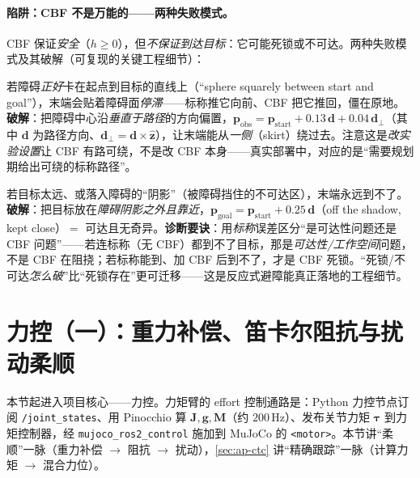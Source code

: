 \paragraph{陷阱：CBF 不是万能的——两种失败模式。}
CBF 保证\emph{安全}（$h\ge0$），但\emph{不保证到达目标}：它可能死锁或不可达。两种失败模式及其破解（可复现的关键工程细节）：

\begin{pitfall}\label{pit:ap-cbf-deadlock}
若障碍\emph{正好}卡在起点到目标的直线上（“sphere squarely between start and goal”），末端会贴着障碍面\emph{停滞}——标称推它向前、CBF 把它推回，僵在原地。\textbf{破解}：把障碍中心沿\emph{垂直于路径}的方向偏置，$\mathbf{p}_{\mathrm{obs}}=\mathbf{p}_{\mathrm{start}}+0.13\,\mathbf{d}+0.04\,\mathbf{d}_\perp$（其中 $\mathbf{d}$ 为路径方向、$\mathbf{d}_\perp=\mathbf{d}\times\hat{\mathbf{z}}$），让末端能从\emph{一侧}（skirt）绕过去。注意这是\emph{改实验设置}让 CBF 有路可绕，不是改 CBF 本身——真实部署中，对应的是“需要规划期给出可绕的标称路径”。
\end{pitfall}

\begin{pitfall}\label{pit:ap-cbf-unreach}
若目标太远、或落入障碍的“阴影”（被障碍挡住的不可达区），末端永远到不了。\textbf{破解}：把目标放在\emph{障碍阴影之外且靠近}，$\mathbf{p}_{\mathrm{goal}}=\mathbf{p}_{\mathrm{start}}+0.25\,\mathbf{d}$（off the shadow, kept close）$=$ 可达且无奇异。\textbf{诊断要诀}：用\emph{标称}误差区分“是可达性问题还是 CBF 问题”——若连标称（无 CBF）都到不了目标，那是\emph{可达性/工作空间}问题，不是 CBF 在阻挠；若标称能到、加 CBF 后到不了，才是 CBF 死锁。“死锁/不可达\emph{怎么破}”比“死锁存在”更可迁移——这是反应式避障能真正落地的工程细节。
\end{pitfall}

\section{力控（一）：重力补偿、笛卡尔阻抗与扰动柔顺}
\label{sec:ap-impedance}

本节起进入项目核心——力控。力矩臂的 effort 控制通路是：Python 力控节点订阅 \texttt{/joint\_states}、用 Pinocchio 算 $\mathbf{J},\mathbf{g},\mathbf{M}$（约 $200\,\mathrm{Hz}$）、发布关节力矩 $\boldsymbol{\tau}$ 到力矩控制器，经 \texttt{mujoco\_ros2\_control} 施加到 MuJoCo 的 \texttt{<motor>}。本节讲“柔顺”一脉（重力补偿 $\to$ 阻抗 $\to$ 扰动），\cref{sec:ap-ctc} 讲“精确跟踪”一脉（计算力矩 $\to$ 混合力位）。

